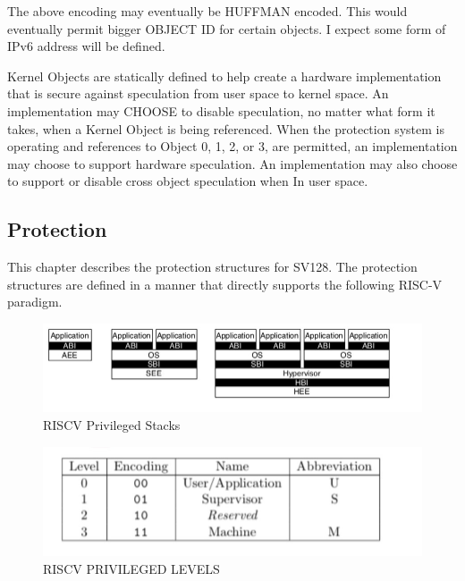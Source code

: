 \documentclass{article}
\begin{document}
The above encoding may eventually be HUFFMAN encoded.  This would eventually permit bigger OBJECT ID for certain objects.  I expect some form of IPv6 address will be defined.

Kernel Objects are statically defined to help create a hardware implementation that is secure against speculation from user space to kernel space.  An implementation may CHOOSE to disable speculation, no matter what form it takes,  when a Kernel Object is  being referenced.  When the protection system is operating  and references to  Object 0, 1, 2, or 3,  are permitted,  an implementation may choose to support hardware speculation.  An implementation may also choose to support or disable cross object speculation when In user space.

\subsection{Protection}

This chapter describes the protection structures  for SV128.  The protection structures are defined in a manner that directly supports the following RISC-V paradigm.



\begin{figure}[h]
\begin{center}
\includegraphics[scale = .4]
{figures/figure1c_riscv_stacks_privileged.jpg}
\caption{RISC\-V Privileged Stacks}
\end{center}
\end{figure}

\begin{figure}[h]
\begin{center}
\includegraphics[scale = .4]
{figures/figure2_privileged_level_simple.jpg}  
\caption{RISC\-V PRIVILEGED LEVELS}
\end{center}
\end{figure}
\end{document}
